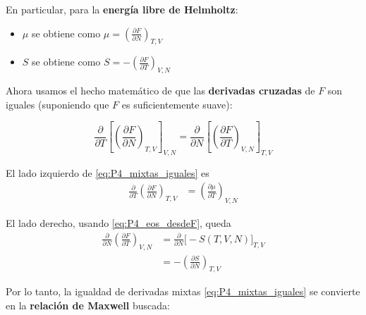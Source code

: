 \documentclass{article}
\begin{document}
En particular, para la \textcolor{Lochinvar}{\textbf{energía libre de Helmholtz}}:

\begin{itemize}
  \item[$\bullet$] \(\mu\) se obtiene como
  \(\displaystyle
  \mu = \left(\frac{\partial F}{\partial N}\right)_{T,V}
  \)
  \item[$\bullet$] \(S\) se obtiene como
  \(\displaystyle
  S = -\left(\frac{\partial F}{\partial T}\right)_{V,N}
  \)
\end{itemize}

\vspace{0.3cm}

Ahora usamos el hecho matemático de que las \textcolor{trueblue}{\textbf{derivadas cruzadas}}
de \(F\) son iguales (suponiendo que \(F\) es suficientemente suave):

\begin{equation}
\frac{\partial}{\partial T}
\left[
  \left(\frac{\partial F}{\partial N}\right)_{T,V}
\right]_{V,N}
=
\frac{\partial}{\partial N}
\left[
  \left(\frac{\partial F}{\partial T}\right)_{V,N}
\right]_{T,V}
\label{eq:P4_mixtas_iguales}
\end{equation}

El lado izquierdo de \eqref{eq:P4_mixtas_iguales} es
\begin{equation}
\begin{split}
\frac{\partial}{\partial T}
\left(\frac{\partial F}{\partial N}\right)_{T,V}
&=
\left(\frac{\partial \mu}{\partial T}\right)_{V,N}
\end{split}
\label{eq:P4_lado_izq}
\end{equation}

El lado derecho, usando \eqref{eq:P4_eos_desdeF}, queda
\begin{equation}
\begin{split}
\frac{\partial}{\partial N}
\left(\frac{\partial F}{\partial T}\right)_{V,N}
&=
\frac{\partial}{\partial N}\big[-S(T,V,N)\big]_{T,V} \\[4pt]
&= -\left(\frac{\partial S}{\partial N}\right)_{T,V}
\end{split}
\label{eq:P4_lado_der}
\end{equation}

Por lo tanto, la igualdad de derivadas mixtas \eqref{eq:P4_mixtas_iguales}
se convierte en la \textcolor{Apple Green}{\textbf{relación de Maxwell}} buscada:
\end{document}
